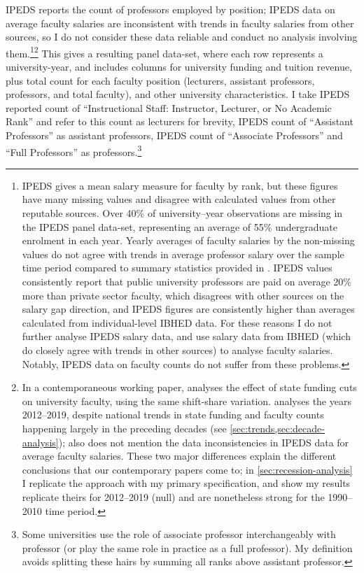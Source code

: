IPEDS reports the count of professors employed by position; IPEDS data on average faculty salaries are inconsistent with trends in faculty salaries from other sources, so I do not consider these data reliable and conduct no analysis involving them.\footnote{
    IPEDS gives a mean salary measure for faculty by rank, but these figures have many missing values and disagree with calculated values from other reputable sources.
    Over 40\% of university--year observations are missing in the IPEDS panel data-set, representing an average of 55\% undergraduate enrolment in each year.
    Yearly averages of faculty salaries by the non-missing values do not agree with trends in average professor salary over the sample time period compared to summary statistics provided in \cite{aau2021survey}.
    IPEDS values consistently report that public university professors are paid on average 20\% more than private sector faculty, which disagrees with other sources on the salary gap direction, and IPEDS figures are consistently higher than averages calculated from individual-level IBHED data.
    For these reasons I do not further analyse IPEDS salary data, and use salary data from IBHED (which do closely agree with trends in other sources) to analyse faculty salaries.
    Notably, IPEDS data on faculty counts do not suffer from these problems.
}\footnote{
    In a contemporaneous working paper, \cite{hinrichs2022state} analyses the effect of state funding cuts on university faculty, using the same shift-share variation.
    \cite{hinrichs2022state} analyses the years 2012--2019, despite national trends in state funding and faculty counts happening largely in the preceding decades (see \autoref{sec:trends,sec:decade-analysis});
    \cite{hinrichs2022state} also does not mention the data inconsistencies in IPEDS data for average faculty salaries.
    These two major differences explain the different conclusions that our contemporary papers come to; in \autoref{sec:recession-analysis} I replicate the \cite{hinrichs2022state} approach with my primary specification, and show my results replicate theirs for 2012--2019 (null) and are nonetheless strong for the 1990--2010 time period.
}
This gives a resulting panel data-set, where each row represents a university-year, and includes columns for university funding and tuition revenue, plus total count for each faculty position (lecturers, assistant professors, professors, and total faculty), and other university characteristics.
I take IPEDS reported count of ``Instructional Staff: Instructor, Lecturer, or No Academic Rank'' and refer to this count as lecturers for brevity, IPEDS count of ``Assistant Professors'' as assistant professors, IPEDS count of ``Associate Professors'' and ``Full Professors'' as professors.\footnote{
    Some universities use the role of associate professor interchangeably with professor (or play the same role in practice as a full professor).
    My definition avoids splitting these hairs by summing all ranks above assistant professor.
}
